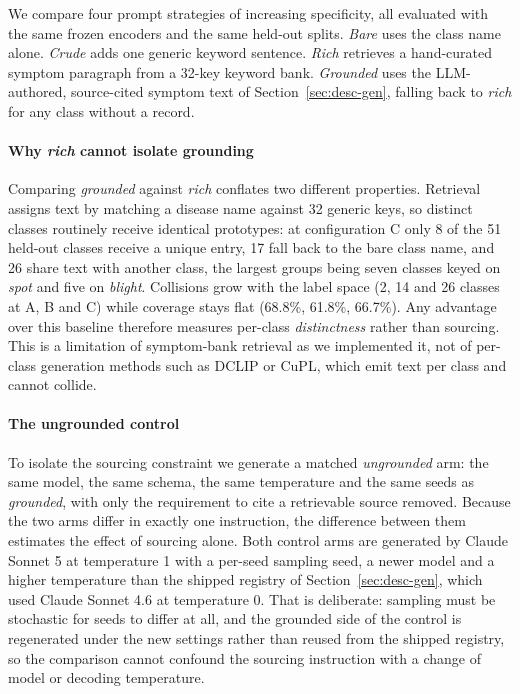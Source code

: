 \documentclass[a4paper,fleqn]{cas-dc}
\begin{document}
We compare four prompt strategies of increasing specificity, all evaluated with the same frozen
encoders and the same held-out splits. \emph{Bare} uses the class name alone. \emph{Crude} adds one
generic keyword sentence. \emph{Rich} retrieves a hand-curated symptom paragraph from a 32-key
keyword bank. \emph{Grounded} uses the LLM-authored, source-cited symptom text of
Section~\ref{sec:desc-gen}, falling back to \emph{rich} for any class without a record.

\paragraph{Why \emph{rich} cannot isolate grounding} Comparing \emph{grounded} against \emph{rich}
conflates two different properties. Retrieval assigns text by matching a disease name against 32
generic keys, so distinct classes routinely receive identical prototypes: at configuration C only 8
of the 51 held-out classes receive a unique entry, 17 fall back to the bare class name, and 26 share
text with another class, the largest groups being seven classes keyed on \emph{spot} and five on
\emph{blight}. Collisions grow with the label space (2, 14 and 26 classes at A, B and C) while
coverage stays flat (68.8\%, 61.8\%, 66.7\%). Any advantage over this baseline therefore measures
per-class \emph{distinctness} rather than sourcing. This is a limitation of symptom-bank retrieval as
we implemented it, not of per-class generation methods such as DCLIP or CuPL, which emit text per
class and cannot collide.

\paragraph{The ungrounded control} To isolate the sourcing constraint we generate a matched
\emph{ungrounded} arm: the same model, the same schema, the same temperature and the same seeds as
\emph{grounded}, with only the requirement to cite a retrievable source removed. Because the two arms
differ in exactly one instruction, the difference between them estimates the effect of sourcing
alone. Both control arms are generated by Claude Sonnet 5 at temperature 1 with a per-seed sampling
seed, a newer model and a higher temperature than the shipped registry of
Section~\ref{sec:desc-gen}, which used Claude Sonnet 4.6 at temperature 0. That is deliberate:
sampling must be stochastic for seeds to differ at all, and the grounded side of the control is
regenerated under the new settings rather than reused from the shipped registry, so the comparison
cannot confound the sourcing instruction with a change of model or decoding temperature.
\end{document}

